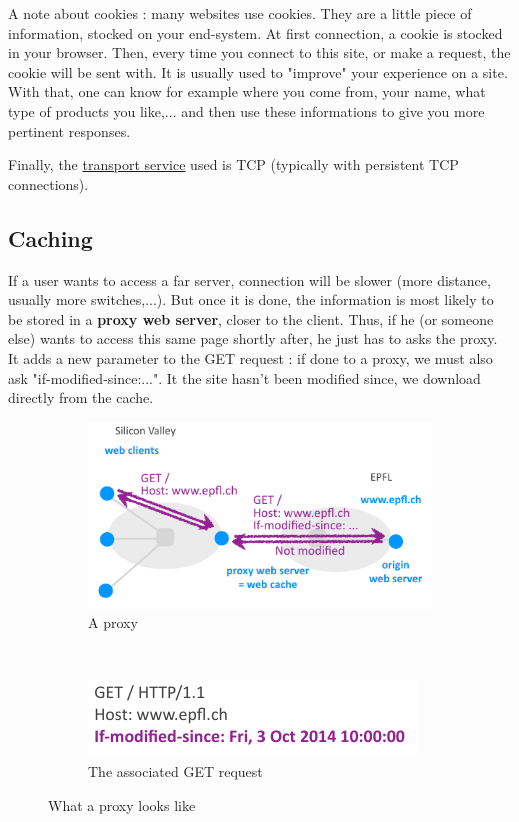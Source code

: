 \documentclass[12pt,a4paper]{article}
\begin{document}
\begin{exemple}
	A note about cookies : many websites use cookies. They are a little piece of information, stocked on your end-system. At first connection, a cookie is stocked in your browser. Then, every time you connect to this site, or make a request, the cookie will be sent with. It is usually used to "improve" your experience on a site. With that, one can know for example where you come from, your name, what type of products you like,... and then use these informations to give you more pertinent responses.
\end{exemple} 

Finally, the \uline{transport service} used is TCP (typically with persistent TCP connections).

\subsection{Caching} \label{subs: caching}
If a user wants to access a far server, connection will be slower (more distance, usually more switches,...). But once it is done, the information is most likely to be stored in a \textbf{proxy web server}, closer to the client. Thus, if he (or someone else) wants to access this same page shortly after, he just has to asks the proxy. It adds a new parameter to the GET request : if done to a proxy, we must also ask "if-modified-since:...". It the site hasn't been modified since, we download directly from the cache.

\begin{figure}[h]
	\centering
	\begin{subfigure}[b]{0.55\textwidth}
		\includegraphics[scale=0.7]{images/proxy}
		\caption{A proxy}
		\label{fig: proxy scheme}
	\end{subfigure}
	~
	\begin{subfigure}[b]{0.4\textwidth}
		\includegraphics[scale=0.7]{images/getProxy}
		\caption{The associated GET request}
		\label{fig: proxy get}
	\end{subfigure}
	\caption{What a proxy looks like}
	\label{figs: proxy}
\end{figure}
\end{document}

